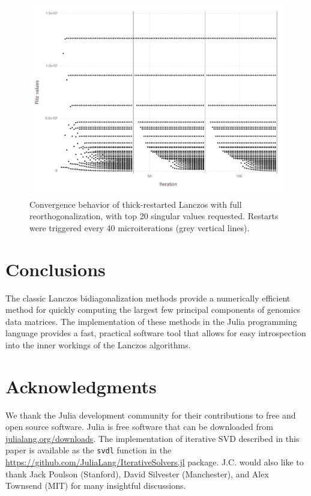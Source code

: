\documentclass[final,leqno]{siamltex1213}
\begin{document}
\begin{figure}
\caption{Convergence behavior of thick-restarted Lanczos with full reorthogonalization, with top 20 singular values requested. Restarts were triggered every 40 microiterations (grey vertical lines).
\label{fig:lanczos-tr}
}

\includegraphics[width=\textwidth]{fig/thickrestarted/fig-conv}
\end{figure}



\section{Conclusions}

The classic Lanczos bidiagonalization methods provide a numerically efficient
method for quickly computing the largest few principal components of genomics
data matrices. The implementation of these methods in the Julia programming
language provides a fast, practical software tool that allows for easy
introspection into the inner workings of the Lanczos algorithms.

\section*{Acknowledgments}

We thank the Julia development community for their contributions to free and
open source software. Julia is free software that can be downloaded from
\url{julialang.org/downloads}. The implementation of iterative SVD described in
this paper is available as the \verb|svdl| function in the
\href{IterativeSolvers.jl}{https://github.com/JuliaLang/IterativeSolvers.jl}
package. J.C. would also like to thank Jack Poulson (Stanford), David Silvester
(Manchester), and Alex Townsend (MIT) for many insightful discussions.


\end{document}
